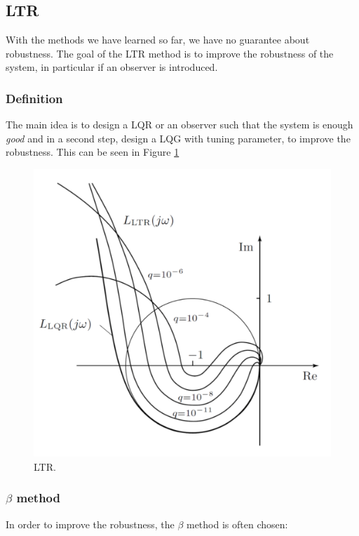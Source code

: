 \documentclass[a4paper,12 pt]{article}
\numberwithin{equation}{section}
\theoremstyle{definition}
\theoremstyle{remark}
\theoremstyle{definition}
\theoremstyle{definition}
\theoremstyle{definition}
\theoremstyle{remark}
\begin{document}
\newpage
\pagebreak
\subsection{LTR}
With the methods we have learned so far, we have no guarantee about robustness. The goal of the LTR method is to improve the robustness of the system, in particular if an observer is introduced. 
\subsubsection{Definition}
The main idea is to design a LQR or an observer such that the system is enough \textit{good} and in a second step, design a LQG with tuning parameter, to improve the robustness. This can be seen in Figure \ref{fig:LTR}


\begin{figure}[h]
\centering\includegraphics[width=0.5\columnwidth]{LTR}
\caption{LTR.}
\label{fig:LTR}
\end{figure}

\subsubsection{$\beta$ method}
In order to improve the robustness, the $\beta$ method is often chosen:
\end{document}
